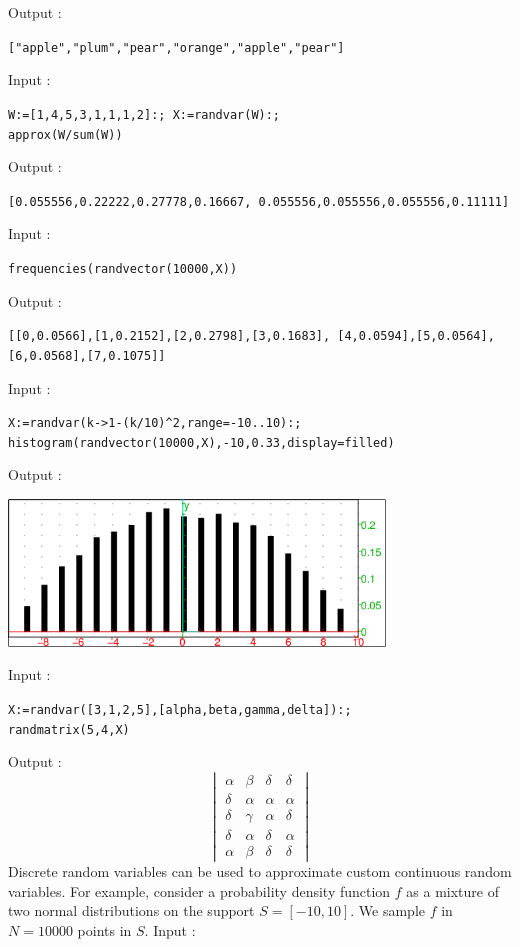 \documentclass[a4paper,11pt]{book}
\begin{document}
Output :
\begin{center}
  \tt ["apple","plum","pear","orange","apple","pear"]
\end{center}
Input :
\begin{center}
  \tt W:=[1,4,5,3,1,1,1,2]:; X:=randvar(W):;\\approx(W/sum(W))
\end{center}
Output :
\begin{center}
  \tt [0.055556,0.22222,0.27778,0.16667, 0.055556,0.055556,0.055556,0.11111]
\end{center}
Input :
\begin{center}
  \tt frequencies(randvector(10000,X))
\end{center}
Output :
\begin{center}
  \tt [[0,0.0566],[1,0.2152],[2,0.2798],[3,0.1683], [4,0.0594],[5,0.0564],[6,0.0568],[7,0.1075]]
\end{center}
Input :
\begin{center}
  \tt X:=randvar(k->1-(k/10)\verb|^|2,range=-10..10):;\\histogram(randvector(10000,X),-10,0.33,display=filled)
\end{center}
Output :
\begin{center}
  \includegraphics[width=0.75\textwidth]{random_hist1.png}
\end{center}
Input :
\begin{center}
  \tt X:=randvar([3,1,2,5],[alpha,beta,gamma,delta]):;\\randmatrix(5,4,X)
\end{center}
Output :
\[ \begin{vmatrix}\alpha&\beta&\delta&\delta\\ \delta&\alpha&\alpha&\alpha\\ \delta&\gamma&\alpha&\delta\\
\delta&\alpha&\delta&\alpha\\ \alpha&\beta&\delta&\delta\end{vmatrix}\]
Discrete random variables can be used to approximate custom continuous random variables. For example, consider a probability density function $f$ as a mixture of two normal distributions on the support $S=[-10,10]$. We sample $f$ in $N=10000$ points in $S$. Input :
\end{document}
